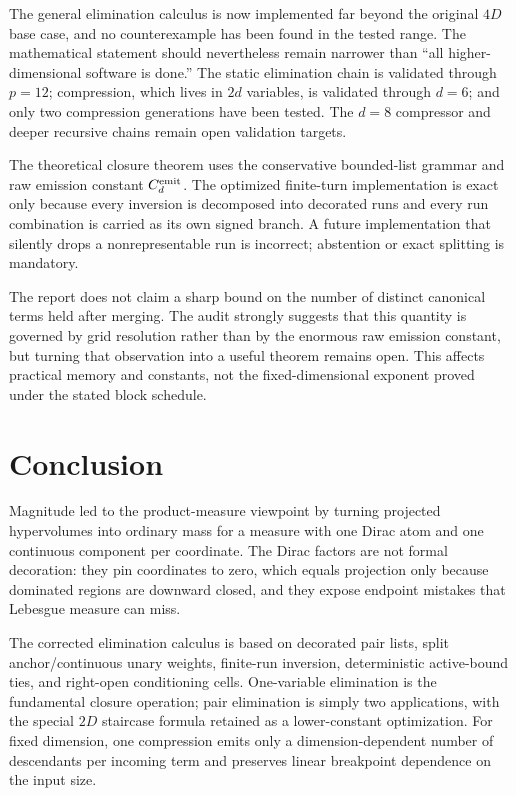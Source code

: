 \documentclass[12pt,a4paper]{article}
\theoremstyle{definition}
\newcommand{\1}{\mathbf 1}
\begin{document}
The general elimination calculus is now implemented far beyond the original $4D$ base case, and no counterexample has been found in the tested range. The mathematical statement should nevertheless remain narrower than ``all higher-dimensional software is done.'' The static elimination chain is validated through $p=12$; compression, which lives in $2d$ variables, is validated through $d=6$; and only two compression generations have been tested. The $d=8$ compressor and deeper recursive chains remain open validation targets.

The theoretical closure theorem uses the conservative bounded-list grammar and raw emission constant $C_d^{\rm emit}$. The optimized finite-turn implementation is exact only because every inversion is decomposed into decorated runs and every run combination is carried as its own signed branch. A future implementation that silently drops a nonrepresentable run is incorrect; abstention or exact splitting is mandatory.

The report does not claim a sharp bound on the number of distinct canonical terms held after merging. The audit strongly suggests that this quantity is governed by grid resolution rather than by the enormous raw emission constant, but turning that observation into a useful theorem remains open. This affects practical memory and constants, not the fixed-dimensional exponent proved under the stated block schedule.

\section{Conclusion}

Magnitude led to the product-measure viewpoint by turning projected hypervolumes into ordinary mass for a measure with one Dirac atom and one continuous component per coordinate. The Dirac factors are not formal decoration: they pin coordinates to zero, which equals projection only because dominated regions are downward closed, and they expose endpoint mistakes that Lebesgue measure can miss.

The corrected elimination calculus is based on decorated pair lists, split anchor/continuous unary weights, finite-run inversion, deterministic active-bound ties, and right-open conditioning cells. One-variable elimination is the fundamental closure operation; pair elimination is simply two applications, with the special $2D$ staircase formula retained as a lower-constant optimization. For fixed dimension, one compression emits only a dimension-dependent number of descendants per incoming term and preserves linear breakpoint dependence on the input size.
\end{document}
